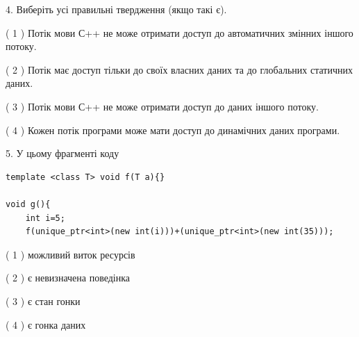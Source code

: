 \documentclass[12pt, ukrainian]{article}
\begin{document}
\begin {large}
{%
4. Виберіть усі правильні твердження (якщо такі є).\par
\vspace{2mm}

( 1 ) Потік мови С++ не може отримати доступ до автоматичних змінних іншого потоку.%

( 2 ) Потік має доступ тільки до своїх власних даних та до глобальних статичних даних.%

( 3 ) Потік мови С++ не може отримати доступ до даних іншого потоку.%

( 4 ) Кожен потік програми може мати доступ до динамічних даних програми.%


5. У цьому фрагменті коду
\begin{verbatim}
template <class T> void f(T a){}

void g(){
    int i=5;
    f(unique_ptr<int>(new int(i)))+(unique_ptr<int>(new int(35)));
\end{verbatim}
( 1 ) можливий виток ресурсів%

( 2 ) є невизначена поведінка%

( 3 ) є стан гонки%

( 4 ) є гонка даних%
}
\end {large}
\end{document}
